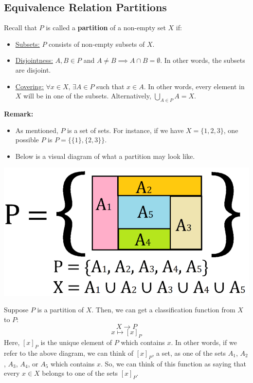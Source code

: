 \documentclass[letterpaper]{article}
\begin{document}
\subsection{Equivalence Relation Partitions}
Recall that $P$ is called a \textbf{partition} of a non-empty set $X$ if:
\begin{itemize}
    \item \underline{Subsets:} $P$ consists of non-empty subsets of $X$. 
    \item \underline{Disjointness:} $A, B \in P$ and $A \neq B \implies A \cap B = \emptyset$. In other words, the subsets are disjoint. 
    \item \underline{Covering:} $\forall x \in X$, $\exists A \in P$ such that $x \in A$. In other words, every element in $X$ will be in one of the subsets. Alternatively, $\bigcup_{A \in P} A = X$. 
\end{itemize}

\textbf{Remark:}
\begin{itemize}
    \item As mentioned, $P$ is a set of sets. For instance, if we have $X = \{1, 2, 3\}$, one possible $P$ is $P = \{\{1\}, \{2, 3\}\}$.
    \item Below is a visual diagram of what a partition may look like.
\end{itemize}
\begin{center}
    \includegraphics[scale=0.4]{img/partition.PNG}
\end{center}

Suppose $P$ is a partition of $X$. Then, we can get a classification function from $X$ to $P$:
\[X \to P\]
\[x \mapsto [x]_P\]
Here, $[x]_P$ is the unique element of $P$ which contains $x$. In other words, if we refer to the above diagram, we can think of $[x]_P$, a set, as one of the sets $A_1$, $A_2$, $A_3$, $A_4$, or $A_5$ which contains $x$. So, we can think of this function as saying that every $x \in X$ belongs to one of the sets $[x]_P$. 
\end{document}
